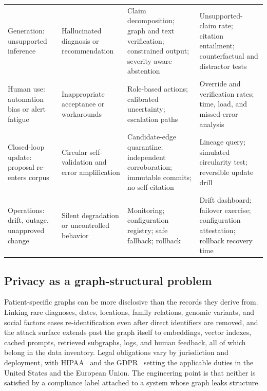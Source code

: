\begin{table}[!t]
\begin{tabularx}{\textwidth}{@{}L{3.0cm} L{2.6cm} Y Y@{}}
Generation: unsupported inference & Hallucinated diagnosis or recommendation & Claim decomposition; graph and text verification; constrained output; severity-aware abstention & Unsupported-claim rate; citation entailment; counterfactual and distractor tests \\
Human use: automation bias or alert fatigue & Inappropriate acceptance or workarounds & Role-based actions; calibrated uncertainty; escalation paths & Override and verification rates; time, load, and missed-error analysis \\
Closed-loop update: proposal re-enters corpus & Circular self-validation and error amplification & Candidate-edge quarantine; independent corroboration; immutable commits; no self-citation & Lineage query; simulated circularity test; reversible update drill \\
Operations: drift, outage, unapproved change & Silent degradation or uncontrolled behavior & Monitoring; configuration registry; safe fallback; rollback & Drift dashboard; failover exercise; configuration attestation; rollback recovery time \\
\bottomrule
\end{tabularx}
\end{table}


\subsection{Privacy as a graph-structural problem}

Patient-specific graphs can be more disclosive than the records they derive from. Linking rare diagnoses, dates, locations, family relations, genomic variants, and social factors eases re-identification even after direct identifiers are removed, and the attack surface extends past the graph itself to embeddings, vector indexes, cached prompts, retrieved subgraphs, logs, and human feedback, all of which belong in the data inventory. Legal obligations vary by jurisdiction and deployment, with HIPAA~\cite{hhsocr} and the GDPR~\cite{gdpr} setting the applicable duties in the United States and the European Union. The engineering point is that neither is satisfied by a compliance label attached to a system whose graph leaks structure.

